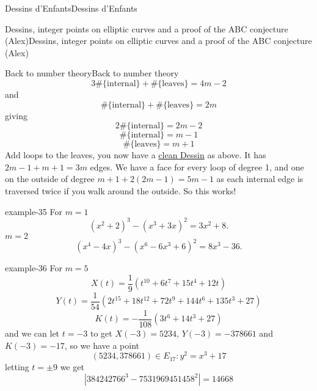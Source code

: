 \documentclass[10pt,]{book}
\numberwithin{equation}{section}
\begin{document}
\begin{chapterptx}{Dessins d'Enfants}{}{Dessins d'Enfants}{}{}
\begin{sectionptx}{Dessins, integer points on elliptic curves and a proof of the ABC conjecture (Alex)}{}{Dessins, integer points on elliptic curves and a proof of the ABC conjecture (Alex)}{}{}
\begin{subsectionptx}{Back to number theory}{}{Back to number theory}{}{}
\begin{equation*}
3 \#\{\text{internal}\} + \#\{\text{leaves}\} =  4m - 2
\end{equation*}
and%
\begin{equation*}
\#\{\text{internal}\} + \#\{\text{leaves}\} =  2m
\end{equation*}
giving%
\begin{equation*}
2\#\{\text{internal}\} =  2m - 2
\end{equation*}
%
\begin{equation*}
\#\{\text{internal}\} =  m - 1
\end{equation*}
%
\begin{equation*}
\#\{\text{leaves}\} =  m + 1
\end{equation*}
Add loops to the leaves, you now have a \hyperref[def-clean-dessin]{clean Dessin} as above. It has \(2m- 1 + m + 1 = 3m\) edges. We have a face for every loop of degree 1, and one on the outside of degree \(m+ 1 +2(2m-1)  = 5m - 1\) as each internal edge is traversed twice if you walk around the outside. So this works!%
\begin{example}{}{example-35}%
\hypertarget{p-729}{}%
For \(m= 1\)%
\begin{equation*}
(x^2 + 2)^3 - (x^3 + 3x)^2 = 3x^2 + 8\text{.}
\end{equation*}
\(m= 2\)%
\begin{equation*}
(x^4 - 4x)^3 - (x^6 -6x^3+6)^2  = 8x^3 - 36\text{.}
\end{equation*}
%
\end{example}
\begin{example}{}{example-36}%
\hypertarget{p-730}{}%
For \(m =5\)%
\begin{equation*}
X(t) = \frac 19 (t^{10} + 6t^7 +15 t^4 + 12t)
\end{equation*}
%
\begin{equation*}
Y(t) = \frac{1}{54} (2t^{15} + 18t^{12} +72 t^9 + 144 t^6 + 135 t^3 + 27)
\end{equation*}
%
\begin{equation*}
K(t) = -\frac{1}{108} (3t^{6} + 14t^3 +27)
\end{equation*}
and we can let \(t = -3\) to get \(X(-3) = 5234\), \(Y(-3) = -378661\) and \(K(-3) = -17\), so we have a point%
\begin{equation*}
(5234, 378661) \in E_{17} \colon y^2 = x^3 + 17
\end{equation*}
letting \(t = \pm 9\) we get%
\begin{equation*}
|384242766^3 - 7531969451458^2| = 14668

\end{equation*}
\end{example}
\end{subsectionptx}
\end{sectionptx}
\end{chapterptx}
\end{document}
